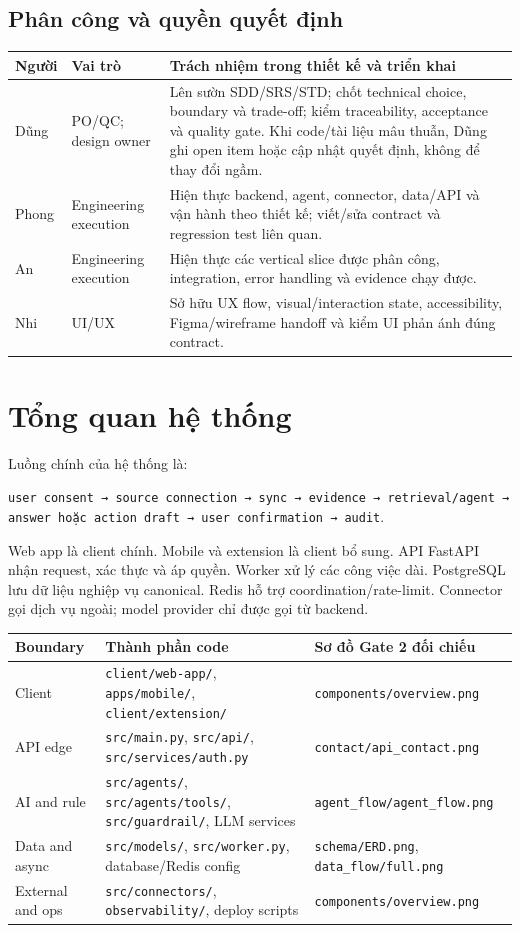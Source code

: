 \documentclass[12pt,a4paper]{article}
\begin{document}
\subsection{Phân công và quyền quyết định}
\begin{longtable}{p{2.3cm}p{3.7cm}p{8.1cm}}
\toprule Người & Vai trò & Trách nhiệm trong thiết kế và triển khai \\ \midrule
\endhead
Dũng & PO/QC; design owner & Lên sườn SDD/SRS/STD; chốt technical choice, boundary và trade-off; kiểm traceability, acceptance và quality gate. Khi code/tài liệu mâu thuẫn, Dũng ghi open item hoặc cập nhật quyết định, không để thay đổi ngầm. \\
Phong & Engineering execution & Hiện thực backend, agent, connector, data/API và vận hành theo thiết kế; viết/sửa contract và regression test liên quan. \\
An & Engineering execution & Hiện thực các vertical slice được phân công, integration, error handling và evidence chạy được. \\
Nhi & UI/UX & Sở hữu UX flow, visual/interaction state, accessibility, Figma/wireframe handoff và kiểm UI phản ánh đúng contract. \\
\bottomrule
\end{longtable}

\section{Tổng quan hệ thống}
Luồng chính của hệ thống là:
\begin{center}
\texttt{user consent → source connection → sync → evidence → retrieval/agent → answer hoặc action draft → user confirmation → audit}.
\end{center}
Web app là client chính. Mobile và extension là client bổ sung. API FastAPI nhận
request, xác thực và áp quyền. Worker xử lý các công việc dài. PostgreSQL lưu
dữ liệu nghiệp vụ canonical. Redis hỗ trợ coordination/rate-limit. Connector gọi
dịch vụ ngoài; model provider chỉ được gọi từ backend.

\begin{longtable}{p{3cm}p{5.2cm}p{5.8cm}}
\toprule Boundary & Thành phần code & Sơ đồ Gate 2 đối chiếu \\ \midrule
\endhead
Client & \texttt{client/web-app/}, \texttt{apps/mobile/}, \texttt{client/extension/} & \texttt{components/overview.png} \\
API edge & \texttt{src/main.py}, \texttt{src/api/}, \texttt{src/services/auth.py} & \texttt{contact/api\_contact.png} \\
AI and rule & \texttt{src/agents/}, \texttt{src/agents/tools/}, \texttt{src/guardrail/}, LLM services & \texttt{agent\_flow/agent\_flow.png} \\
Data and async & \texttt{src/models/}, \texttt{src/worker.py}, database/Redis config & \texttt{schema/ERD.png}, \texttt{data\_flow/full.png} \\
External and ops & \texttt{src/connectors/}, \texttt{observability/}, deploy scripts & \texttt{components/overview.png} \\
\bottomrule
\end{longtable}
\end{document}
